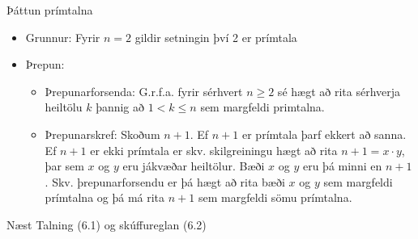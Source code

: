 \documentclass[handout]{beamer}
\begin{document}
\begin{frame}{Þáttun prímtalna}
    \begin{itemize}
        \item Grunnur: Fyrir $n=2$ gildir setningin því 2 er prímtala
        \item Þrepun:
        \begin{itemize}
            \item Þrepunarforsenda: G.r.f.a. fyrir sérhvert $n \geq 2$ sé hægt að rita sérhverja heiltölu $k$ þannig að $1 < k \leq n$ sem margfeldi primtalna. \pause
            \item Þrepunarskref: Skoðum $n+1$. Ef $n+1$ er prímtala þarf ekkert að sanna. Ef $n+1$ er ekki prímtala er skv. skilgreiningu hægt að rita $n +1 = x\cdot y$, þar sem $x$ og $y$ eru jákvæðar heiltölur. Bæði $x$ og $y$ eru þá minni en $n+1$. Skv. þrepunarforsendu er þá hægt að rita bæði $x$ og $y$ sem margfeldi prímtalna og þá má rita $n+1$ sem margfeldi sömu prímtalna.
        \end{itemize}
    \end{itemize}
\end{frame}


\begin{frame}{Næst}
Talning (6.1) og skúffureglan (6.2)
\end{frame}
\end{document}
